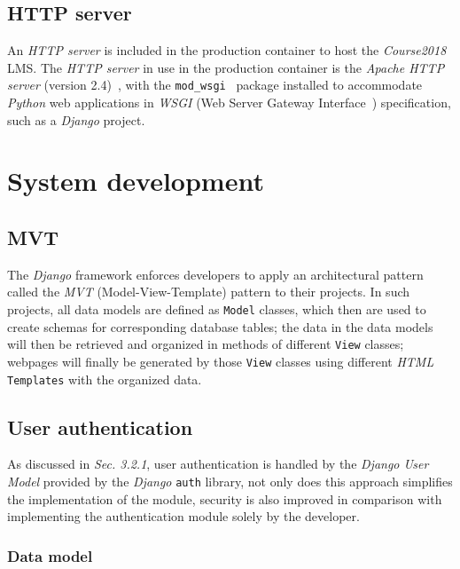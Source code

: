 \subsection{HTTP server}
An \emph{HTTP server} is included in the production container to host the
\emph{Course2018} LMS.
The \emph{HTTP server} in use in the production container is the
\emph{Apache HTTP server} (version 2.4)~\cite{apache}, with the
\texttt{mod\_wsgi}~\cite{wsgi} package installed to accommodate
\emph{Python} web applications in \emph{WSGI}
(Web Server Gateway Interface~\cite{wsgi}) specification, such as a
\emph{Django} project.

\section{System development}

\subsection{MVT}
The \emph{Django} framework enforces developers to apply an architectural
pattern called the \emph{MVT} (Model-View-Template) pattern to their projects.
In such projects,
all data models are defined as \texttt{Model} classes, which
then are used to create schemas for corresponding database tables;
the data in the data models will then be retrieved and organized in 
methods of different \texttt{View} classes;
webpages will finally be generated by those \texttt{View} classes
using different \emph{HTML} \texttt{Templates} with the organized data.





\subsection{User authentication}
As discussed in \emph{Sec. 3.2.1}, user authentication is handled by the
\emph{Django User Model} provided by the \emph{Django} \texttt{auth} library,
not only does this approach simplifies the implementation of the module,
security is also improved in comparison with implementing the authentication
module solely by the developer.

\subsubsection{Data model}


